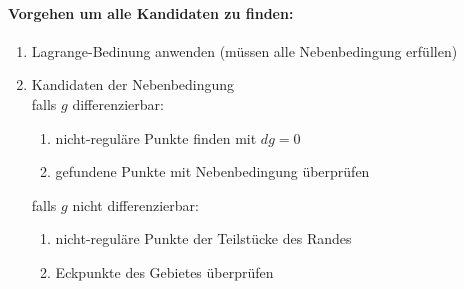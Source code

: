 \documentclass[11pt]{article}
\begin{document}
\paragraph{Vorgehen um alle Kandidaten zu finden:}
\begin{enumerate}[noitemsep]
	\item Lagrange-Bedinung anwenden (müssen alle Nebenbedingung erfüllen)
	\item Kandidaten der Nebenbedingung \\
	falls $g$ differenzierbar: 
	\begin{enumerate}[noitemsep]
		\item nicht-reguläre Punkte finden mit $dg = 0$
		\item gefundene Punkte mit Nebenbedingung überprüfen
	\end{enumerate}
	falls $g$ nicht differenzierbar:
	\begin{enumerate}[noitemsep]
		\item nicht-reguläre Punkte der Teilstücke des Randes
		\item Eckpunkte des Gebietes überprüfen
	\end{enumerate}
\end{enumerate}
\end{document}
